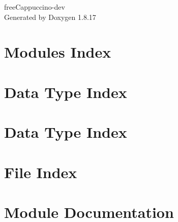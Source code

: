 \let\mypdfximage\pdfximage\def\pdfximage{\immediate\mypdfximage}\documentclass[twoside]{book}
\newcommand{\+}{\discretionary{\mbox{\scriptsize$\hookleftarrow$}}{}{}}
\newcommand{\clearemptydoublepage}{%
  \newpage{\pagestyle{empty}\cleardoublepage}%
}
\begin{document}
\hypersetup{pageanchor=false,
             bookmarksnumbered=true,
             pdfencoding=unicode
            }
\begin{titlepage}
\vspace*{7cm}
\begin{center}%
{\Large free\+Cappuccino-\/dev }\\
\vspace*{1cm}
{\large Generated by Doxygen 1.8.17}\\
\end{center}
\end{titlepage}
\clearemptydoublepage
{}
\tableofcontents
\clearemptydoublepage
{}
\hypersetup{pageanchor=true}

\chapter{Modules Index}

\chapter{Data Type Index}

\chapter{Data Type Index}

\chapter{File Index}

\chapter{Module Documentation}



































\end{document}
